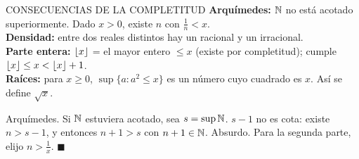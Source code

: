 \agregado
\begin{sello}{CONSECUENCIAS DE LA COMPLETITUD}
\textbf{Arquímedes:} $\mathbb{N}$ no está acotado superiormente. Dado $x>0$, existe $n$ con $\frac1n<x$.\\[2pt]
\textbf{Densidad:} entre dos reales distintos hay un racional y un irracional.\\[2pt]
\textbf{Parte entera:} $\lfloor x\rfloor$ = el mayor entero $\le x$ (existe por completitud); cumple $\lfloor x\rfloor\le x<\lfloor x\rfloor+1$.\\[2pt]
\textbf{Raíces:} para $x\ge0$, $\sup\{a:a^2\le x\}$ es un número cuyo cuadrado es $x$. Así se define $\sqrt x$.
\end{sello}
\begin{demo}
Arquímedes. Si $\mathbb{N}$ estuviera acotado, sea $s=\sup\mathbb{N}$. $s-1$ no es cota: existe $n>s-1$, y entonces $n+1>s$ con $n+1\in\mathbb{N}$. Absurdo. Para la segunda parte, elijo $n>\frac1x$. $\blacksquare$
\end{demo}
